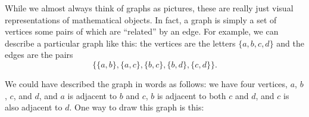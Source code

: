 \documentclass[10pt,]{book}
\theoremstyle{plain}
\theoremstyle{definition}
\theoremstyle{definition}
\theoremstyle{definition}
\numberwithin{equation}{chapter}
\newcommand{\vtx}[2]{node[fill,circle,inner sep=0pt, minimum size=4pt,label=#1:#2]{}}
\newcommand{\vr}[1]{\vtx{right}{#1}}
\newcommand{\vl}[1]{\vtx{left}{#1}}
\begin{document}
While we almost always think of graphs as pictures, these are really just visual representations of mathematical objects. In fact, a graph is simply a set of vertices some pairs of which are ``related'' by an edge. For example, we can describe a particular graph like this: the vertices are the letters \(\{a,b,c,d\}\) and the edges are the pairs
\begin{equation*}
  \{\{a,b\}, \{a,c\}, \{b,c\}, \{b,d\}, \{c,d\}\}.
\end{equation*}
%
\par

We could have described the graph in words as follows: we have four vertices, \(a\), \(b\), \(c\), and \(d\), and \(a\) is adjacent to \(b\) and \(c\), \(b\) is adjacent to both \(c\) and \(d\), and \(c\) is also adjacent to \(d\). One way to draw this graph is this:
%
\leavevmode%
\begin{figure}
\centering
{
}
\end{figure}
\par
\end{document}
